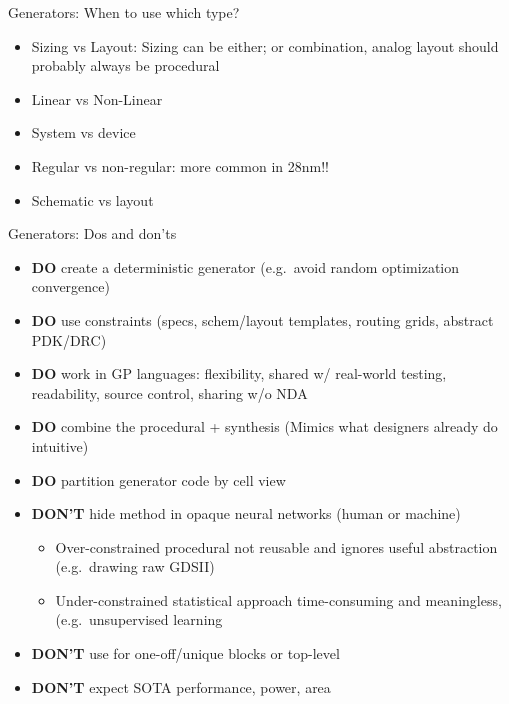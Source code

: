 \begin{frame}{Generators: When to use which type?}
\protect\hypertarget{generators-when-to-use-which-type}{}
\begin{itemize}
\tightlist
\item
  Sizing vs Layout: Sizing can be either; or combination, analog layout
  should probably always be procedural
\item
  Linear vs Non-Linear
\item
  System vs device
\item
  Regular vs non-regular: more common in 28nm!!
\item
  Schematic vs layout
\end{itemize}
\end{frame}

\begin{frame}{Generators: Dos and don'ts}
\protect\hypertarget{generators-dos-and-donts}{}
\begin{itemize}
\tightlist
\item
  \textbf{DO} create a deterministic generator (e.g.~avoid random
  optimization convergence)
\item
  \textbf{DO} use constraints (specs, schem/layout templates, routing
  grids, abstract PDK/DRC)
\item
  \textbf{DO} work in GP languages: flexibility, shared w/ real-world
  testing, readability, source control, sharing w/o NDA
\item
  \textbf{DO} combine the procedural + synthesis (Mimics what designers
  already do intuitive)
\item
  \textbf{DO} partition generator code by cell view
\item
  \textbf{DON'T} hide method in opaque neural networks (human or
  machine)

  \begin{itemize}
  \tightlist
  \item
    Over-constrained procedural not reusable and ignores useful
    abstraction (e.g.~drawing raw GDSII)
  \item
    Under-constrained statistical approach time-consuming and
    meaningless, (e.g.~unsupervised learning
  \end{itemize}
\item
  \textbf{DON'T} use for one-off/unique blocks or top-level
\item
  \textbf{DON'T} expect SOTA performance, power, area
\end{itemize}
\end{frame}


